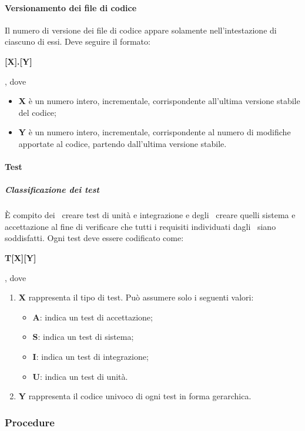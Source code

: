 \documentclass[../NormeProgetto.tex]{subfiles}
\begin{document}
				\paragraph{Versionamento dei file di codice}
					Il numero di versione dei file di codice appare solamente nell'intestazione di ciascuno di essi. Deve seguire il formato:
					\begin{center}\textbf{[X].[Y]}\end{center}, dove
					\begin{itemize}
						\item \textbf{X} è un numero intero, incrementale, corrispondente all'ultima versione stabile del codice;
						\item \textbf{Y} è un numero intero, incrementale, corrispondente al numero di modifiche apportate al codice, partendo dall'ultima versione stabile.
					\end{itemize}
					
				\paragraph{Test}
					\subparagraph{Classificazione dei test}
					È compito dei \programmatori\ creare test di unità e integrazione e degli \analisti\ creare quelli sistema e accettazione al fine di verificare che tutti i requisiti individuati dagli \analisti\ siano soddisfatti. Ogni test deve essere codificato come:
					\begin{center}\textbf{T[X][Y]}\end{center}, dove
						\begin{enumerate}
							\item \textbf{X} rappresenta il tipo di test. Può assumere solo i seguenti valori:
							\begin{itemize}
								\item \textbf{A}: indica un test di accettazione;
								\item \textbf{S}: indica un test di sistema;
								\item \textbf{I}: indica un test di integrazione;
								\item \textbf{U}: indica un test di unità.
							\end{itemize}
							
							\item \textbf{Y} rappresenta il codice univoco di ogni test in forma gerarchica.
						\end{enumerate}
					
		\subsubsection{Procedure}
\end{document}
